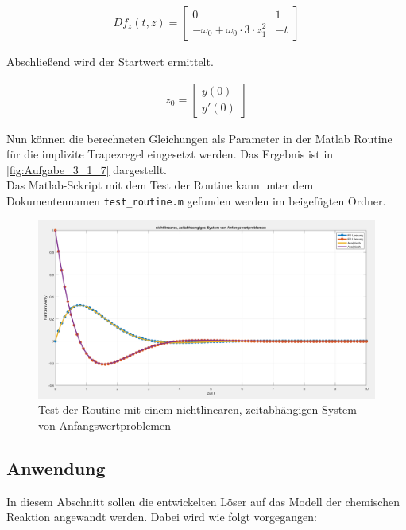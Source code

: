 \documentclass[
	pagesize,
	fontsize=12pt,
	paper=a4,
	oneside,
   reqno
]{scrartcl}
\begin{document}
\begin{align*}
   Df_z(t,z) =
   \begin{bmatrix*}
      0                                            & 1 \\
      -\omega _0 + \omega _0 \cdot 3 \cdot z_1^2  & -t
   \end{bmatrix*}
\end{align*}

Abschließend wird der Startwert ermittelt.

\begin{align*}
   z_0 =
   \begin{bmatrix*}
      y(0) \\
      y'(0)
   \end{bmatrix*}
\end{align*}

Nun können die berechneten Gleichungen als Parameter in der Matlab Routine für die implizite Trapezregel eingesetzt werden. Das Ergebnis ist in \autoref{fig:Aufgabe_3_1_7} dargestellt. \\

Das Matlab-Sckript mit dem Test der Routine kann unter dem Dokumentennamen \texttt{test\_routine.m} gefunden werden im beigefügten Ordner.

\begin{figure}[H]
   \centering
   \includegraphics[width=1\textwidth]{Bilder/Aufgabe_3_1_7.png}
   \caption[Test der Routine]{Test der Routine mit einem nichtlinearen, zeitabhängigen System von Anfangswertproblemen}
   \label{fig:Aufgabe_3_1_7}
\end{figure}

\subsection{Anwendung}

In diesem Abschnitt sollen die entwickelten Löser auf das Modell der chemischen Reaktion angewandt werden. Dabei wird wie folgt vorgegangen:
\end{document}
